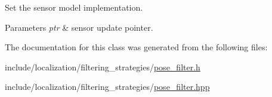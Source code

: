 Set the sensor model implementation. 
\begin{DoxyParams}{Parameters}
{\em ptr} & sensor update pointer. \\
\hline
\end{DoxyParams}


The documentation for this class was generated from the following files\-:\begin{DoxyCompactItemize}
\item 
include/localization/filtering\-\_\-strategies/\hyperlink{pose__filter_8h}{pose\-\_\-filter.\-h}\item 
include/localization/filtering\-\_\-strategies/\hyperlink{pose__filter_8hpp}{pose\-\_\-filter.\-hpp}\end{DoxyCompactItemize}

